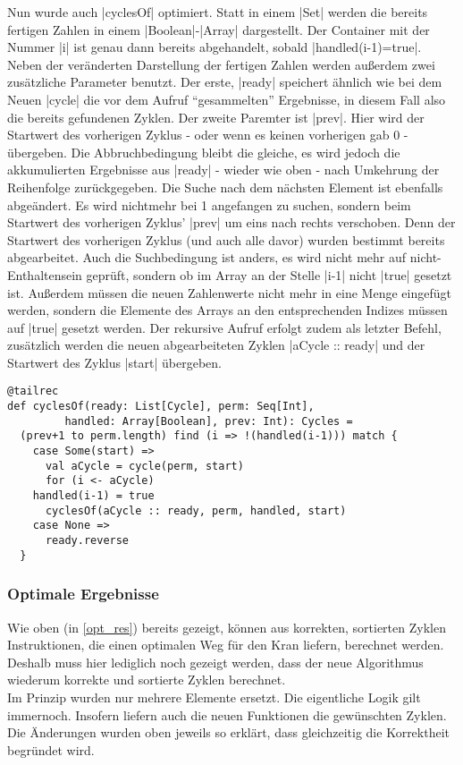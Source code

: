 Nun wurde auch |cyclesOf| optimiert. Statt in einem |Set| werden die bereits fertigen Zahlen in einem |Boolean|-|Array| dargestellt.
Der Container mit der Nummer |i| ist genau dann bereits abgehandelt, sobald |handled(i-1)=true|.
Neben der veränderten Darstellung der fertigen Zahlen werden außerdem zwei zusätzliche Parameter benutzt.
Der erste, |ready| speichert ähnlich wie bei dem Neuen |cycle| die vor dem Aufruf ``gesammelten'' Ergebnisse, in diesem Fall also die bereits gefundenen Zyklen.
Der zweite Paremter ist |prev|. Hier wird der Startwert des vorherigen Zyklus - oder wenn es keinen vorherigen gab 0 - übergeben.
Die Abbruchbedingung bleibt die gleiche, es wird jedoch die akkumulierten Ergebnisse aus |ready| - wieder wie oben - nach Umkehrung der Reihenfolge zurückgegeben.
Die Suche nach dem nächsten Element ist ebenfalls abgeändert.
Es wird nichtmehr bei 1 angefangen zu suchen, sondern beim Startwert des vorherigen Zyklus' |prev| um eins nach rechts verschoben.
Denn der Startwert des vorherigen Zyklus (und auch alle davor) wurden bestimmt bereits abgearbeitet.
Auch die Suchbedingung ist anders, es wird nicht mehr auf nicht-Enthaltensein geprüft, sondern ob im Array an der Stelle |i-1| nicht |true| gesetzt ist.
Außerdem müssen die neuen Zahlenwerte nicht mehr in eine Menge eingefügt werden, sondern die Elemente des Arrays an den entsprechenden Indizes müssen auf |true| gesetzt werden.
Der rekursive Aufruf erfolgt zudem als letzter Befehl,
zusätzlich werden die neuen abgearbeiteten Zyklen |aCycle :: ready| und der Startwert des Zyklus |start| übergeben.
\begin{lstlisting}
@tailrec
def cyclesOf(ready: List[Cycle], perm: Seq[Int],
	     handled: Array[Boolean], prev: Int): Cycles =
  (prev+1 to perm.length) find (i => !(handled(i-1))) match {
    case Some(start) =>
      val aCycle = cycle(perm, start)
      for (i <- aCycle)
	handled(i-1) = true
      cyclesOf(aCycle :: ready, perm, handled, start)
    case None =>
      ready.reverse
  }
\end{lstlisting}

\subsubsection{Optimale Ergebnisse}
Wie oben (in \ref{opt_res}) bereits gezeigt, können aus korrekten, sortierten Zyklen Instruktionen, die einen optimalen Weg für den Kran liefern, berechnet werden.
Deshalb muss hier lediglich noch gezeigt werden, dass der neue Algorithmus wiederum korrekte und sortierte Zyklen berechnet. \\
Im Prinzip wurden nur mehrere Elemente ersetzt. Die eigentliche Logik gilt immernoch. Insofern liefern auch die neuen Funktionen die gewünschten Zyklen.
Die Änderungen wurden oben jeweils so erklärt, dass gleichzeitig die Korrektheit begründet wird.

